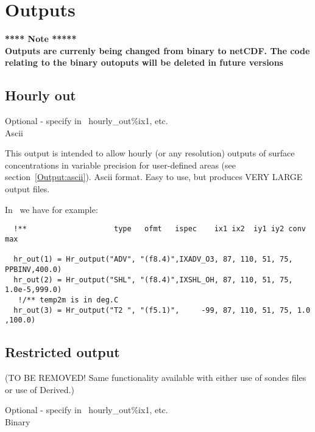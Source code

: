 \chapter{Outputs}
\label{OUTPUTS}

{\bf ***** Note *****\\
Outputs are currenly being changed from binary to netCDF.
The code relating to the binary outoputs will be deleted in future versions}




\section{Hourly out}

\noindent
Optional -  specify in \MyOutputs\, hourly\_out\%ix1, etc.\\
Ascii
\vspace{1cm}

This output is intended to allow hourly (or any resolution) outputs of surface
concentrations in
variable precision for user-defined areas (see section~\ref{Output:ascii}). 
Ascii format. Easy to use, but
produces VERY LARGE output files. 


In \MyOutputs\ we have for example:

\begin{small}\begin{verbatim}
  !**                    type   ofmt   ispec    ix1 ix2  iy1 iy2 conv    max

  hr_out(1) = Hr_output("ADV", "(f8.4)",IXADV_O3, 87, 110, 51, 75, PPBINV,400.0)
  hr_out(2) = Hr_output("SHL", "(f8.4)",IXSHL_OH, 87, 110, 51, 75, 1.0e-5,999.0)
   !/** temp2m is in deg.C
  hr_out(3) = Hr_output("T2 ", "(f5.1)",     -99, 87, 110, 51, 75, 1.0   ,100.0)
\end{verbatim}
\end{small}



\section{Restricted output}
(TO BE REMOVED! Same functionality available with either use of
sondes files or use of Derived.)

\noindent
Optional -  specify in \MyOutputs\, hourly\_out\%ix1, etc.\\
Binary
\vspace{1cm}

